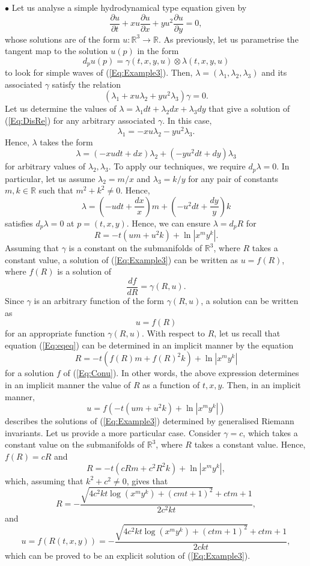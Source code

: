 \documentclass{birkjour}
\theoremstyle{definition}
\theoremstyle{remark}
\numberwithin{equation}{section}
\numberwithin{equation}{section}
\numberwithin{thm}{section}
\numberwithin{equation}{section}
\numberwithin{thm}{section}
\begin{document}
$\bullet$ Let us analyse a simple hydrodynamical type equation given by 
\begin{equation}\label{Eq:Example3}
	\frac{\partial u}{\partial t}+xu\frac{\partial u}{\partial x}+yu^2\frac{\partial u}{\partial y}=0,
\end{equation}
whose solutions are of the form $u:\mathbb{R}^3\rightarrow\mathbb{R}$.
As previously, let us parametrise the tangent map to the solution $u(p)$ in the form
$$
d_pu(p)=\gamma(t,x,y,u)\otimes \lambda(t,x,y,u)
$$
to look for simple waves of (\ref{Eq:Example3}). Then, $\lambda=(\lambda_1,\lambda_2,\lambda_3)$ and its associated $\gamma$ satisfy the relation
\begin{equation}\label{Eq:DisRe}
	(\lambda_1+xu\lambda_2+yu^2\lambda_3)\gamma=0.
\end{equation}
Let us determine the values of $\lambda =\lambda_1dt+\lambda_2dx+\lambda_3dy$ that give a solution of (\ref{Eq:DisRe}) for any arbitrary associated $\gamma$. In this case,
$$
\lambda_1=-xu\lambda_2-yu^2\lambda_3.
$$
Hence, $\lambda$ takes the form
$$
\lambda=(-xudt+dx)\lambda_2+(-yu^2dt+dy)\lambda_3
$$
for arbitrary values of $\lambda_2,\lambda_3$. To apply our techniques, we require $d_p\lambda=0$. In particular, let us assume $\lambda_2=m/x$ and $\lambda_3=k/y$ for any pair of constants $m,k\in \mathbb{R}$ such that $m^2+k^2\neq 0$. Hence,
$$
\lambda=\left(-udt+\frac{dx}{x}\right)m+\left(-u^2dt+\frac{dy}{y}\right)k
$$
satisfies $d_p\lambda=0$ at $p=(t,x,y)$. Hence, we can ensure
$
\lambda=d_pR
$
for
$$
R=-t(um+u^2k)+\ln|x^my^k|.
$$
Assuming that $\gamma$ is a constant on the submanifolds of $\mathbb{R}^3$, where $R$ takes a constant value, a solution of (\ref{Eq:Example3})  can be written as $u=f(R)$, where $f(R)$ is a solution of 
\begin{equation}\label{Eq:Conu}
	\frac{df}{dR}=\gamma(R,u).
\end{equation}
Since $\gamma$ is an arbitrary function of the form $\gamma(R,u)$, a solution can be written as
$$
u=f(R)
$$
for an appropriate function $\gamma(R,u)$. With respect to $R$, let us recall that equation (\ref{Eq:eqeq}) can be determined in an implicit manner by
the equation 
$$
R=-t(f(R)m+f(R)^2k)+\ln|x^my^k|
$$
for a solution $f$ of (\ref{Eq:Conu}). In other words, the above expression determines in an implicit manner the value of $R$ as a function of $t,x,y$.  Then, in an implicit manner, 
$$
u=f(-t(um+u^2k)+\ln|x^my^k|)
$$
describes the solutions of (\ref{Eq:Example3}) determined by generalised Riemann invariants. Let us provide a more particular case. Consider $\gamma=c$, which takes a constant value on the submanifolds of $\mathbb{R}^3$, where $R$ takes a constant value. Hence, $f(R)=c R$ and 
$$
R=-t(c Rm+c^2R^2k)+\ln|x^my^k|,
$$
which, assuming that $k^2+c^2\neq 0$,  gives that
$$R=-\frac{\sqrt{4 c ^2 k t \log \left(x^m y^k\right)+(cm    t+1)^2}+c  tm+1}{2 c^2  k t},
$$
and
$$ u=f(R(t,x,y))=-\frac{\sqrt{4 c^2 k t \log \left(x^m y^k\right)+(c tm+1)^2}+c tm+1}{2 c k t},$$
which can be proved to be an explicit  solution of (\ref{Eq:Example3}). 
\end{document}
